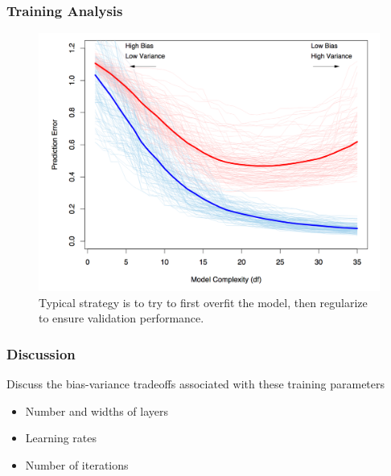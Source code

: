 \documentclass[10pt,mathserif]{beamer}
\begin{document}
\begin{frame}
  \frametitle{Training Analysis}
  \begin{figure}[ht]
    \centering
    \includegraphics[width=0.7\paperwidth]{figure/bias_variance}
    \caption{Typical strategy is to try to first overfit the model, then
      regularize to ensure validation performance. \label{fig:bias_variance} }
  \end{figure}
\end{frame}

\begin{frame}
  \frametitle{Discussion}
  Discuss the bias-variance tradeoffs associated with these training parameters
  \begin{itemize}
    \item Number and widths of layers
    \item Learning rates
    \item Number of iterations
  \end{itemize}
\end{frame}
\end{document}
